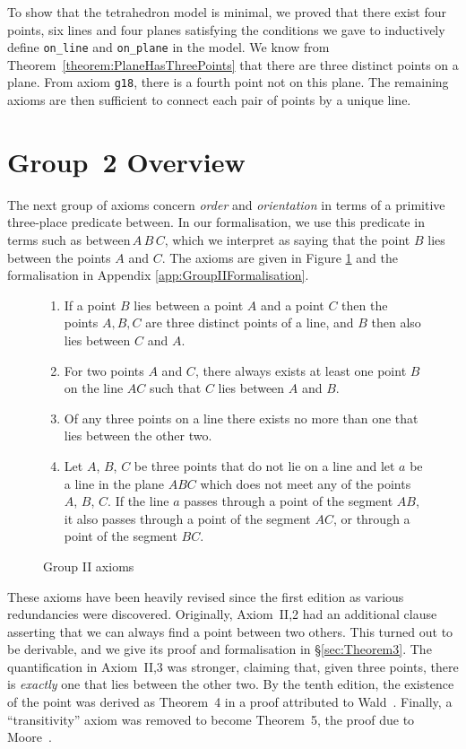 \documentclass{article}
\begin{document}
To show that the tetrahedron model is minimal, we proved that there exist four points, six lines and four planes satisfying the conditions we gave to inductively define \texttt{on\_line} and \texttt{on\_plane} in the model. We know from Theorem~\ref{theorem:PlaneHasThreePoints} that there are three distinct points on a plane. From axiom \texttt{g18}, there is a fourth point not on this plane. The remaining axioms are then sufficient to connect each pair of points by a unique line.

\section{Group~2 Overview}
The next group of axioms concern \emph{order} and \emph{orientation} in terms of a primitive three-place predicate $\text{between}$. In our formalisation, we use this predicate in terms such as $\text{between}\,A\,B\,C$, which we interpret as saying that the point $B$ lies between the points $A$ and $C$. The axioms are given in Figure \ref{fig:GroupII} and the formalisation in Appendix \ref{app:GroupIIFormalisation}.

\begin{figure}
  \begin{enumerate}
  \item[II,1] If a point $B$ lies between a point $A$ and a point $C$ then the points $A,B,C$ are three distinct points of a line, and $B$ then also lies between $C$ and $A$.
  \item[II,2] For two points $A$ and $C$, there always exists at least one point $B$ on the line $AC$ such that $C$ lies between $A$ and $B$.
  \item[II,3] Of any three points on a line there exists no more than one that lies between the other two.
  \item[II,4] Let $A$, $B$, $C$ be three points that do not lie on a line and let $a$ be a line in the plane $ABC$ which does not meet any of the points $A$, $B$, $C$. If the line $a$ passes through a point of the segment $AB$, it also passes through a point of the segment $AC$, or through a point of the segment $BC$.
  \end{enumerate}
  \caption{Group II axioms}
  \label{fig:GroupII}
\end{figure}

These axioms have been heavily revised since the first edition as various redundancies were discovered. Originally, Axiom~II,2 had an additional clause asserting that we can always find a point between two others. This turned out to be derivable, and we give its proof and formalisation in \S\ref{sec:Theorem3}. The quantification in Axiom~II,3 was stronger, claiming that, given three points, there is \emph{exactly} one that lies between the other two. By the tenth edition, the existence of the point was derived as Theorem~4 in a proof attributed to Wald~\cite{FoundationsOfGeometry}. Finally, a ``transitivity'' axiom was removed to become Theorem~5, the proof due to Moore~\cite{MooreProof}.
\end{document}
